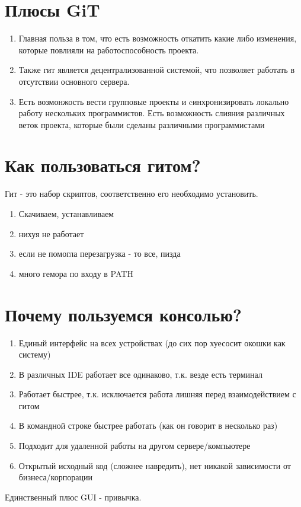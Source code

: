\documentclass[a4paper,12pt]{article}
\begin{document}
\section{Плюсы GiT}\label{vstup_bec}
\begin{enumerate}
    \item Главная польза в том, что есть возможность откатить какие либо изменения, которые повлияли на работоспособность проекта. 
    \item Также гит является децентрализованной системой, что позволяет работать в отсутствии основного сервера. 
    \item Есть возмонжость вести групповые проекты и cинхронизировать локально работу нескольких программистов. Есть возможность слияния различных веток проекта, которые были сделаны различными программистами
\end{enumerate}
\section{Как пользоваться гитом?}
Гит - это набор скриптов, соответственно его необходимо установить. 
\begin{enumerate}
    \item Скачиваем, устанавливаем
    \item нихуя не работает
    \item если не помогла перезагрузка - то все, пизда
    \item много гемора по входу в PATH
\end{enumerate}
\section{Почему пользуемся консолью?}
\begin{enumerate}
    \item Единый интерфейс на всех устройствах (до сих пор хуесосит окошки как систему)
    \item В различных IDE работает все одинаково, т.к. везде есть терминал
    \item Работает быстрее, т.к. исключается работа лишняя перед взаимодействием с гитом
    \item В командной строке быстрее работать (как он говорит в несколько раз)
    \item Подходит для удаленной работы на другом сервере/компьютере
    \item Открытый исходный код (сложнее навредить), нет никакой зависимости от бизнеса/корпорации
\end{enumerate}
Единственный плюс GUI - привычка. 
\end{document}
